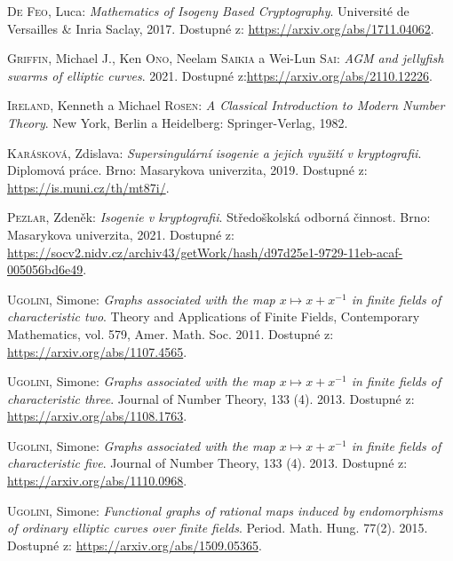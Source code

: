 \documentclass[12pt]{report}
\begin{document}
\begin{thebibliography}{97}

\textsc{De Feo}, Luca: \textit{Mathematics of Isogeny Based Cryptography}. Université de Versailles \& Inria Saclay, 2017. Dostupné z: \url{https://arxiv.org/abs/1711.04062}.

\textsc{Griffin}, Michael J., Ken \textsc{Ono}, Neelam \textsc{Saikia} a Wei-Lun \textsc{Sai}: \textit{AGM and jellyfish swarms of elliptic curves}. 2021. Dostupné z:\url{https://arxiv.org/abs/2110.12226}.


\textsc{Ireland}, Kenneth a Michael \textsc{Rosen}: \textit{A Classical Introduction to Modern Number Theory}. New York, Berlin a Heidelberg: Springer-Verlag, 1982.


\textsc{Karásková}, Zdislava: \textit{Supersingulární isogenie a jejich využití v kryptografii}. Diplomová práce. Brno: Masarykova univerzita, 2019. Dostupné z:  \url{https://is.muni.cz/th/mt87i/}.

\textsc{Pezlar}, Zdeněk: \textit{Isogenie v kryptografii}. Středoškolská odborná činnost. Brno: Masarykova univerzita, 2021. Dostupné z: \url{https://socv2.nidv.cz/archiv43/getWork/hash/d97d25e1-9729-11eb-acaf-005056bd6e49}.

\textsc{Ugolini}, Simone: \textit{Graphs associated with the map $x\mapsto x+x^{-1}$ in finite fields of characteristic two}. Theory and Applications of Finite Fields, Contemporary Mathematics, vol. 579, Amer. Math. Soc. 2011. Dostupné z: \url{https://arxiv.org/abs/1107.4565}.


\textsc{Ugolini}, Simone: \textit{Graphs associated with the map $x\mapsto x+x^{-1}$ in finite fields of characteristic three}. Journal of Number Theory, 133 (4). 2013. Dostupné z: \url{https://arxiv.org/abs/1108.1763}.

\textsc{Ugolini}, Simone: \textit{Graphs associated with the map $x\mapsto x+x^{-1}$ in finite fields of characteristic five}. Journal of Number Theory, 133 (4). 2013. Dostupné z: \url{https://arxiv.org/abs/1110.0968}.

\textsc{Ugolini}, Simone: \textit{Functional graphs of rational maps induced by endomorphisms of ordinary elliptic curves over finite fields}. Period. Math. Hung. 77(2). 2015. Dostupné z: \url{https://arxiv.org/abs/1509.05365}.



\end{thebibliography}
\end{document}
